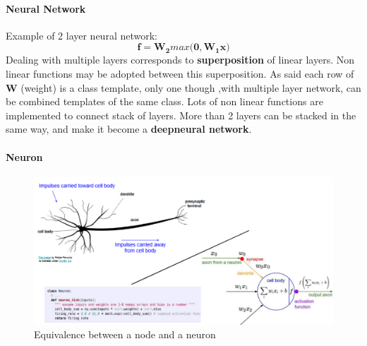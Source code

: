 \documentclass[11pt]{article}
\begin{document}
\paragraph{Neural Network}
Example of 2 layer neural network: 
\begin{equation}
   \mathbf{f} = \mathbf{W_2 }max(\mathbf{0, W_1 x)} 
\end{equation}{}
Dealing with multiple layers corresponds to \textbf{superposition} of linear layers.
Non linear functions may be adopted  between this superposition. As said each row of \textbf{W} (weight) is a class template, only one though
,with multiple layer network,  can be combined templates of the same class. Lots of non linear functions are implemented to connect  stack of  layers.
More than 2 layers can be stacked in the same way, and make it become a \textbf{\textquotesingle \textquotesingle deep\textquotesingle \textquotesingle neural network}.
\clearpage
\paragraph{Neuron}
\begin{figure}[h]
\centering
\captionsetup{justification=centering}
\includegraphics[width=1\linewidth]{L315.pdf}
\caption{ Equivalence between a node and  a neuron}
\label{fig:L315}
\end{figure}
\end{document}
